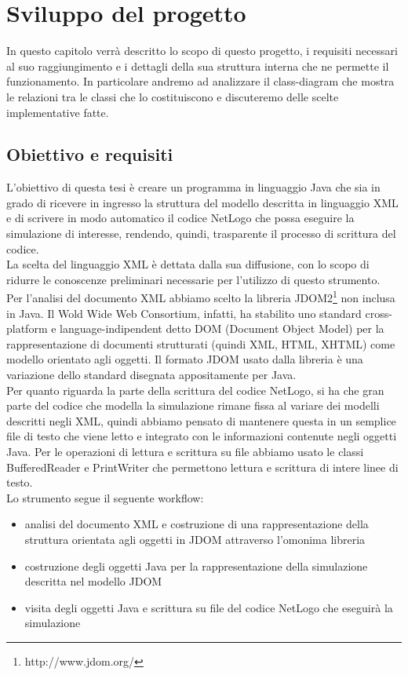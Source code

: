 \chapter{Sviluppo del progetto}
In questo capitolo verrà descritto lo scopo di questo progetto, i requisiti necessari al suo raggiungimento e i dettagli della sua struttura interna che ne permette il funzionamento. In particolare andremo ad analizzare il class-diagram che mostra le relazioni tra le classi che lo costituiscono e discuteremo delle scelte implementative fatte.

\section{Obiettivo e requisiti}
L'obiettivo di questa tesi è creare un programma in linguaggio Java che sia in grado di ricevere in ingresso la struttura del modello descritta in linguaggio XML e di scrivere in modo automatico il codice NetLogo che possa eseguire la simulazione di interesse, rendendo, quindi, trasparente il processo di scrittura del codice.\\
La scelta del linguaggio XML è dettata dalla sua diffusione, con lo scopo di ridurre le conoscenze preliminari necessarie per l'utilizzo di questo strumento.\\
Per l'analisi del documento XML abbiamo scelto la libreria JDOM2\footnote{http://www.jdom.org/} non inclusa in Java. Il Wold Wide Web Consortium, infatti, ha stabilito uno standard cross-platform e language-indipendent detto DOM (Document Object Model) per la rappresentazione di documenti strutturati (quindi XML, HTML, XHTML) come modello orientato agli oggetti. Il formato JDOM usato dalla libreria è una variazione dello standard disegnata appositamente per Java.\\
Per quanto riguarda la parte della scrittura del codice NetLogo, si ha che gran parte del codice che modella la simulazione rimane fissa al variare dei modelli descritti negli XML, quindi abbiamo pensato di mantenere questa in un semplice file di testo che viene letto e integrato con le informazioni contenute negli oggetti Java. Per le operazioni di lettura e scrittura su file abbiamo usato le classi BufferedReader e PrintWriter che permettono lettura e scrittura di intere linee di testo.\\ 
Lo strumento segue il seguente workflow:
\begin{itemize}
\item analisi del documento XML e costruzione di una rappresentazione della struttura orientata agli oggetti in JDOM attraverso l'omonima libreria
\item costruzione degli oggetti Java per la rappresentazione della simulazione descritta nel modello JDOM 
\item visita degli oggetti Java e scrittura su file del codice NetLogo che eseguirà la simulazione
\end{itemize}

